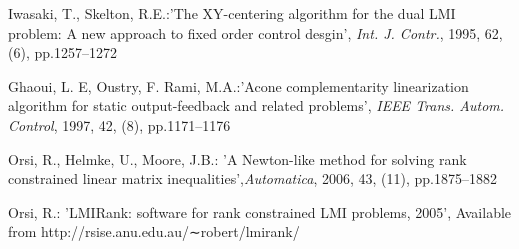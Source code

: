 \documentclass[11pt,draftcls,onecolumn]{IEEEtran}
\begin{document}
\begin{thebibliography}{0}
Iwasaki, T., Skelton, R.E.:'The XY-centering algorithm for the dual LMI problem: A new
approach to ﬁxed order control desgin', \emph{Int. J. Contr.},  1995, 62, (6), pp.1257--1272

Ghaoui, L. E, Oustry, F. Rami, M.A.:'Acone complementarity linearization algorithm for static output-feedback and related problems', \emph{IEEE Trans. Autom. Control}, 1997, 42, (8),
 pp.1171--1176

Orsi, R., Helmke, U., Moore, J.B.: 'A Newton-like method for solving rank constrained linear matrix inequalities',\emph{Automatica}, 2006, 43, (11), pp.1875--1882

Orsi, R.: 'LMIRank: software for rank constrained LMI problems,
2005', Available from http://rsise.anu.edu.au/∼robert/lmirank/



\end{thebibliography}
\end{document}
